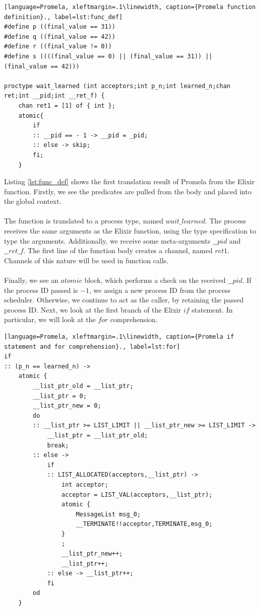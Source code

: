 \begin{lstlisting}[language=Promela, xleftmargin=.1\linewidth, caption={Promela function definition}., label=lst:func_def]
#define p ((final_value == 31))
#define q ((final_value == 42))
#define r ((final_value != 0))
#define s ((((final_value == 0) || (final_value == 31)) || (final_value == 42)))

proctype wait_learned (int acceptors;int p_n;int learned_n;chan ret;int __pid;int __ret_f) {
    chan ret1 = [1] of { int }; 
    atomic{
        if
        :: __pid == - 1 -> __pid = _pid;
        :: else -> skip;
        fi;
    }
\end{lstlisting}
Listing \ref{lst:func_def} shows the first translation result of Promela from the Elixir function. Firstly, we see the predicates are pulled from the body and placed into the global context.
\\ \\
The function is translated to a process type, named $wait\_learned$. The process receives the same arguments as the Elixir function, using the type specification to type the arguments. Additionally, we receive some meta-arguments $\_\_pid$ and $\_\_ret\_f$. The first line of the function body creates a channel, named $ret1$. Channels of this nature will be used in function calls.
\\ \\
Finally, we see an $atomic$ block, which performs a check on the received $\_\_pid$. If the process ID passed is $-1$, we assign a new process ID from the process scheduler. Otherwise, we continue to act as the caller, by retaining the passed process ID.
Next, we look at the first branch of the Elixir $if$ statement. In particular, we will look at the $for$ comprehension.
\begin{lstlisting}[language=Promela, xleftmargin=.1\linewidth, caption={Promela if statement and for comprehension}., label=lst:for]
if
:: (p_n == learned_n) -> 
    atomic {
        __list_ptr_old = __list_ptr;
        __list_ptr = 0;
        __list_ptr_new = 0;
        do
        :: __list_ptr >= LIST_LIMIT || __list_ptr_new >= LIST_LIMIT -> 
            __list_ptr = __list_ptr_old;
            break;
        :: else -> 
            if
            :: LIST_ALLOCATED(acceptors,__list_ptr) -> 
                int acceptor;
                acceptor = LIST_VAL(acceptors,__list_ptr);
                atomic {
                    MessageList msg_0;
                    __TERMINATE!!acceptor,TERMINATE,msg_0; 
                }
                ;
                __list_ptr_new++;
                __list_ptr++;
            :: else -> __list_ptr++;
            fi
        od
    }
\end{lstlisting}
